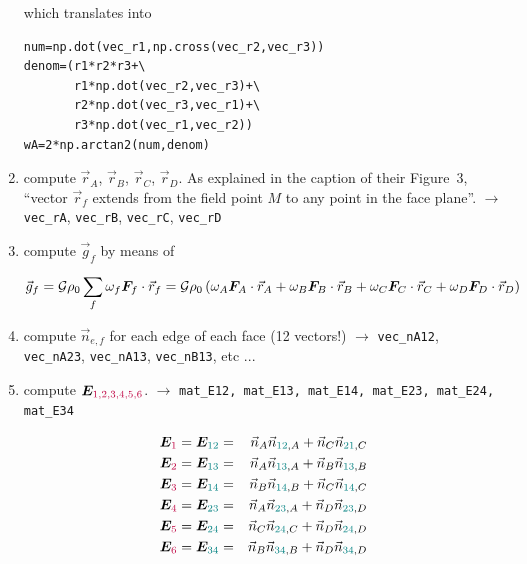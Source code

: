 \begin{enumerate}
which translates into
\begin{lstlisting}
num=np.dot(vec_r1,np.cross(vec_r2,vec_r3))
denom=(r1*r2*r3+\
       r1*np.dot(vec_r2,vec_r3)+\
       r2*np.dot(vec_r3,vec_r1)+\
       r3*np.dot(vec_r1,vec_r2))
wA=2*np.arctan2(num,denom)
\end{lstlisting}


\item compute $\vec{r}_{A}$, $\vec{r}_{B}$, $\vec{r}_{C}$, $\vec{r}_{D}$.
As explained in the caption of their Figure~3, ``vector $\vec{r}_f$
extends from the field point $M$ to any point in the face plane''.
$\rightarrow$ \verb|vec_rA|, \verb|vec_rB|, \verb|vec_rC|, \verb|vec_rD|

\item compute $\vec{g}_f$ by means of %

\[
\vec{g}_f
= {\cal G} \rho_0 \sum_f \omega_f {\bm F}_f\cdot \vec{r}_f 
= {\cal G} \rho_0 \left(
\omega_A {\bm F}_A\cdot \vec{r}_A +
\omega_B {\bm F}_B\cdot \vec{r}_B +
\omega_C {\bm F}_C\cdot \vec{r}_C +
\omega_D {\bm F}_D\cdot \vec{r}_D 
\right)
\]




\item compute $\vec{n}_{e,f}$ for each edge of each face (12 vectors!)
$\rightarrow$ \verb|vec_nA12|, \verb|vec_nA23|, \verb|vec_nA13|, \verb|vec_nB13|, etc ...


\item compute ${\bm E}_{\color{purple} 1,2,3,4,5,6}$. 
$\rightarrow$ \verb|mat_E12, mat_E13, mat_E14, mat_E23, mat_E24, mat_E34| 

\begin{eqnarray}
{\bm E}_{\color{purple}1} ={\bm E}_{\color{teal}12}
&=&\vec{n}_A \vec{n}_{{\color{teal}12},A} +\vec{n}_C \vec{n}_{{\color{teal}21},C}\\
{\bm E}_{\color{purple}2} ={\bm E}_{\color{teal}13}
&=& \vec{n}_A \vec{n}_{{\color{teal}13},A} +\vec{n}_B \vec{n}_{{\color{teal}13},B} \\
{\bm E}_{\color{purple}3} ={\bm E}_{\color{teal}14}
&=& \vec{n}_B \vec{n}_{{\color{teal}14},B}+\vec{n}_C \vec{n}_{{\color{teal}14},C} \\
{\bm E}_{\color{purple}4} ={\bm E}_{\color{teal}23}
&=& \vec{n}_A \vec{n}_{{\color{teal}23},A}+\vec{n}_D \vec{n}_{{\color{teal}23},D} \\
{\bm E}_{\color{purple}5} ={\bm E}_{\color{teal}24}
&=& \vec{n}_C \vec{n}_{{\color{teal}24},C} +\vec{n}_D \vec{n}_{{\color{teal}24},D} \\  
{\bm E}_{\color{purple}6} ={\bm E}_{\color{teal}34}
&=& \vec{n}_B \vec{n}_{{\color{teal}34},B} +\vec{n}_D \vec{n}_{{\color{teal}34},D} 
\end{eqnarray}




\end{enumerate}
